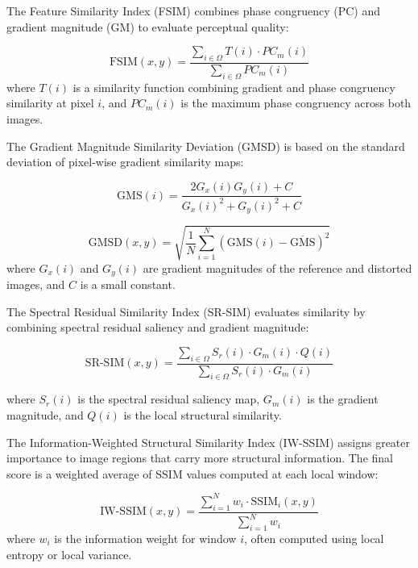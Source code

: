 The Feature Similarity Index (FSIM) combines phase congruency (PC) and gradient magnitude (GM) to evaluate perceptual quality:

\begin{equation}
\text{FSIM}(x, y) = \frac{\sum_{i \in \Omega} T(i) \cdot PC_m(i)}{\sum_{i \in \Omega} PC_m(i)}
\end{equation}
where $T(i)$ is a similarity function combining gradient and phase congruency similarity at pixel $i$, and $PC_m(i)$ is the maximum phase congruency across both images.

The Gradient Magnitude Similarity Deviation (GMSD) is based on the standard deviation of pixel-wise gradient similarity maps:

\begin{equation}
\text{GMS}(i) = \frac{2G_x(i) G_y(i) + C}{{G_x(i)}^2 + {G_y(i)}^2 + C}
\end{equation}

\begin{equation}
\text{GMSD}(x, y) = \sqrt{\frac{1}{N} \sum_{i=1}^{N} {\left( \text{GMS}(i) - \overline{\text{GMS}} \right)}^2}
\end{equation}
where $G_x(i)$ and $G_y(i)$ are gradient magnitudes of the reference and distorted images, and $C$ is a small constant.

The Spectral Residual Similarity Index (SR-SIM) evaluates similarity by combining spectral residual saliency and gradient magnitude:

\begin{equation}
\text{SR-SIM}(x, y) = \frac{\sum_{i \in \Omega} S_r(i) \cdot G_m(i) \cdot Q(i)}{\sum_{i \in \Omega} S_r(i) \cdot G_m(i)}
\end{equation}

where $S_r(i)$ is the spectral residual saliency map, $G_m(i)$ is the gradient magnitude, and $Q(i)$ is the local structural similarity.

The Information-Weighted Structural Similarity Index (IW-SSIM) assigns greater importance to image regions that carry more structural information. The final score is a weighted average of SSIM values computed at each local window:

\begin{equation}
\text{IW-SSIM}(x, y) = \frac{\sum_{i=1}^{N} w_i \cdot \text{SSIM}_i(x, y)}{\sum_{i=1}^{N} w_i}
\end{equation}
where $w_i$ is the information weight for window $i$, often computed using local entropy or local variance.

